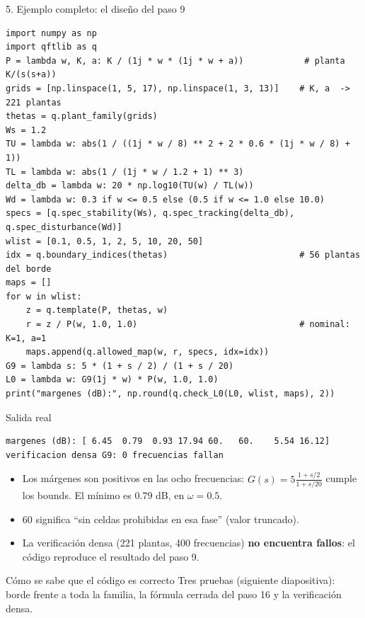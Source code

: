 \documentclass[aspectratio=169,11pt]{beamer}
\begin{document}
\begin{frame}[fragile]{5. Ejemplo completo: el diseño del paso 9}
\scriptsize
\begin{verbatim}
import numpy as np
import qftlib as q
P = lambda w, K, a: K / (1j * w * (1j * w + a))            # planta K/(s(s+a))
grids = [np.linspace(1, 5, 17), np.linspace(1, 3, 13)]    # K, a  -> 221 plantas
thetas = q.plant_family(grids)
Ws = 1.2
TU = lambda w: abs(1 / ((1j * w / 8) ** 2 + 2 * 0.6 * (1j * w / 8) + 1))
TL = lambda w: abs(1 / (1j * w / 1.2 + 1) ** 3)
delta_db = lambda w: 20 * np.log10(TU(w) / TL(w))
Wd = lambda w: 0.3 if w <= 0.5 else (0.5 if w <= 1.0 else 10.0)
specs = [q.spec_stability(Ws), q.spec_tracking(delta_db), q.spec_disturbance(Wd)]
wlist = [0.1, 0.5, 1, 2, 5, 10, 20, 50]
idx = q.boundary_indices(thetas)                          # 56 plantas del borde
maps = []
for w in wlist:
    z = q.template(P, thetas, w)
    r = z / P(w, 1.0, 1.0)                                # nominal: K=1, a=1
    maps.append(q.allowed_map(w, r, specs, idx=idx))
G9 = lambda s: 5 * (1 + s / 2) / (1 + s / 20)
L0 = lambda w: G9(1j * w) * P(w, 1.0, 1.0)
print("margenes (dB):", np.round(q.check_L0(L0, wlist, maps), 2))
\end{verbatim}
\end{frame}

\begin{frame}[fragile]{Salida real}
  \footnotesize
  \begin{verbatim}
margenes (dB): [ 6.45  0.79  0.93 17.94 60.   60.    5.54 16.12]
verificacion densa G9: 0 frecuencias fallan
  \end{verbatim}
  \begin{itemize}
    \item Los márgenes son positivos en las ocho frecuencias: $G(s)=5\frac{1+s/2}{1+s/20}$ cumple los bounds. El mínimo es $0.79$ dB, en $\omega=0.5$.
    \item $60$ significa ``sin celdas prohibidas en esa fase'' (valor truncado).
    \item La verificación densa (221 plantas, 400 frecuencias) \textbf{no encuentra fallos}: el código reproduce el resultado del paso 9.
  \end{itemize}
  \begin{alertblock}{Cómo se sabe que el código es correcto}
    Tres pruebas (siguiente diapositiva): borde frente a toda la familia, la fórmula cerrada del paso 16 y la verificación densa.
  \end{alertblock}
\end{frame}
\end{document}
